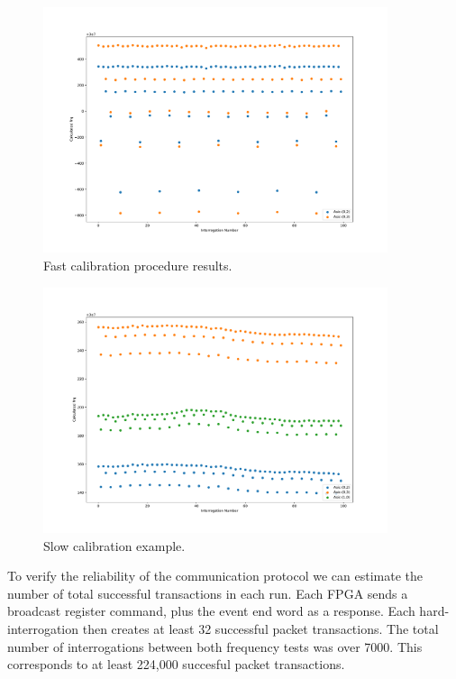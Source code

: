 \begin{figure}[]
\centering
\includegraphics[width=0.9\textwidth]{images/fast_example.pdf}
\caption{Fast calibration procedure results.}
\end{figure}

\begin{figure}[]
\centering
\includegraphics[width=0.9\textwidth]{images/slow_example.pdf}
\caption{Slow calibration example.}
\end{figure}






To verify the reliability of the communication protocol we can estimate the number of total successful transactions in each run.
Each FPGA sends a broadcast register command, plus the event end word as a response.
Each hard-interrogation then creates at least 32 successful packet transactions. 
The total number of interrogations between both frequency tests was over 7000.
This corresponds to at least 224,000 succesful packet transactions.


